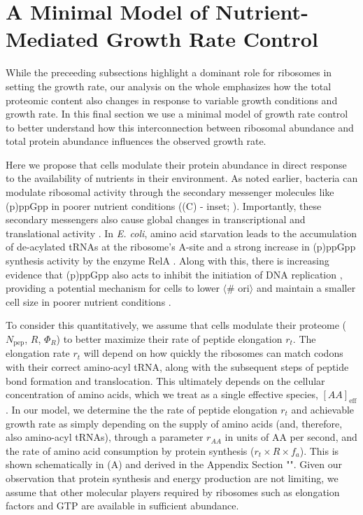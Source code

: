 \section{A Minimal Model of Nutrient-Mediated Growth Rate Control}
\label{sec:minimal_model}
While the preceeding subsections highlight a dominant role for ribosomes in
setting the growth rate, our analysis on the whole emphasizes how the total
proteomic content also changes in response to variable growth conditions and
growth rate. In this final section we use a minimal model of growth rate control
to better understand how this interconnection between ribosomal abundance and
total protein abundance influences the observed growth rate.

Here we propose that cells modulate their protein abundance in direct response
to the availability of nutrients in their environment. As noted earlier,
bacteria can modulate ribosomal activity through the secondary messenger
molecules like (p)ppGpp in poorer nutrient conditions ((C) -
inset; \cite{dai2016}). Importantly, these secondary messengers also cause
global changes in transcriptional and translational activity
\citep{hauryliuk2015, zhu2019, Buke2020}. In \textit{E. coli}, amino acid
starvation leads to the accumulation of de-acylated tRNAs at the ribosome's
A-site and a strong increase in (p)ppGpp synthesis activity by the enzyme RelA
\citep{hauryliuk2015}. Along with this,  there is increasing evidence that
(p)ppGpp also acts to inhibit the initiation of DNA replication
\citep{kraemer2019}, providing a potential mechanism for cells to lower $\langle$\#
ori$\rangle$ and maintain a smaller cell size in poorer nutrient conditions
\citep{fernandezcoll2020}.

To consider this quantitatively, we assume that cells modulate their proteome
($N_\text{pep}$, $R$, $\Phi_R$) to better maximize their rate of peptide
elongation $r_t$. The elongation rate $r_t$ will depend on how quickly the ribosomes can
match codons with their correct amino-acyl tRNA, along with the subsequent steps
of peptide bond formation and translocation. This ultimately depends on the
cellular concentration of amino acids, which we treat as a single effective
species, $[AA]_\text{eff}$. In our model, we determine the the rate of peptide
elongation $r_t$ and achievable growth rate as simply depending on the supply of
amino acids (and, therefore, also amino-acyl tRNAs), through a parameter
$r_{AA}$ in units of AA per second, and the rate of amino acid consumption by
protein synthesis ($r_t \times R \times f_a$). This is shown schematically in
(A) and derived in the Appendix Section "". Given our observation
that protein synthesis and energy production are not limiting, we
assume that other molecular players required by ribosomes such as elongation
factors and GTP are available in sufficient abundance.

